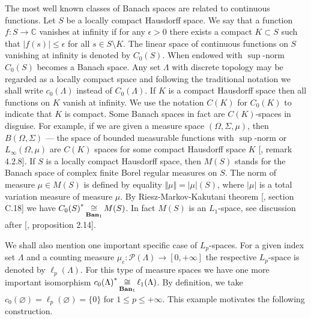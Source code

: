 The most well known classes of Banach spaces are related to continuous
functions. Let $S$ be a locally compact Hausdorff space. We say that a function
$f:S\to\mathbb{C}$ vanishes at infinity  if for any $\epsilon>0$ there exists a
compact $K\subset S$ such that $|f(s)|\leq\epsilon$ for all $s\in S\setminus K$.
The linear space of continuous functions on $S$ vanishing at infinity is denoted
by $C_0(S)$. When endowed with $\sup$-norm $C_0(S)$ becomes a Banach space. Any
set $\Lambda$ with discrete topology may be regarded as a locally compact space
and following the traditional notation we shall write $c_0(\Lambda)$ instead of
$C_0(\Lambda)$. If $K$ is a compact Hausdorff space then all functions on $K$
vanish at infinity. We use the notation $C(K)$ for $C_0(K)$ to indicate that $K$
is compact. Some Banach spaces in fact are $C(K)$-spaces in disguise. For
example, if we are given a measure space $(\Omega,\Sigma,\mu)$, then
$B(\Omega,\Sigma)$ --- the space of bounded measurable functions with
$\sup$-norm or $L_\infty(\Omega,\mu)$ are $C(K)$ spaces for some compact
Hausdorff space $K$ [\cite{KalAlbTopicsBanSpTh}, remark 4.2.8]. If $S$ is a
locally compact Hausdorff space, then $M(S)$ stands for the Banach space of
complex finite Borel regular measures on $S$. The norm of measure $\mu\in M(S)$
is defined by equality $\Vert\mu\Vert=|\mu|(S)$, where $|\mu|$ is a total
variation measure of measure $\mu$. By Riesz-Markov-Kakutani theorem
[\cite{ConwACoursInFuncAn}, section C.18] we have
${C_0(S)}^*\mathop{\mathbin{\cong}}\limits_{\mathbf{Ban}_1}M(S)$. In fact $M(S)$ is an $L_1$-space, see
discussion after [\cite{DalLauSecondDualOfMeasAlg}, proposition 2.14]. 

We shall also mention one important specific case of $L_p$-spaces. For a given
index set $\Lambda$ and a counting measure
$\mu_c:\mathcal{P}(\Lambda)\to[0,+\infty]$ the respective $L_p$-space is denoted
by $\ell_p(\Lambda)$. For this type of measure spaces we have one more important
isomorphism ${c_0(\Lambda)}^*\mathop{\mathbin{\cong}}\limits_{\mathbf{Ban}_1}\ell_1(\Lambda)$. By definition, 
we take $c_0(\varnothing)=\ell_p(\varnothing)= \{0 \}$ for 
$1\leq p\leq+\infty$. This example motivates the following construction.

